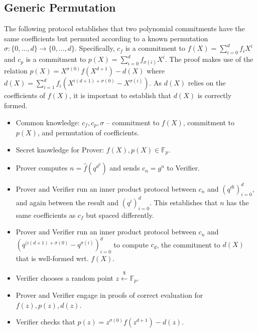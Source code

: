 \documentclass{article}
\theoremstyle{definition}
\begin{document}
\subsection{Generic Permutation}

The following protocol establishes that two polynomial commitments have the same coefficients but permuted according to a known permutation $\sigma : \{0,\ldots,d\} \rightarrow \{0,\ldots,d\}$. Specifically, $c_f$ is a commitment to $f(X) = \sum_{i=0}^d f_i X^i$ and $c_p$ is a commitment to $p(X) = \sum_{i=0}^d f_{\sigma(i)} X^i$. The proof makes use of the relation $p(X) = X^{\sigma(0)} f(X^{d+1}) - d(X)$ where $d(X) = \sum_{i=1}^d f_i (X^{i(d+1) + \sigma(0)} - X^{\sigma(i)})$. As $d(X)$ relies on the coefficients of $f(X)$, it is important to establish that $d(X)$ is correctly formed.

\begin{itemize}
    \item Common knowledge: $c_f, c_p, \sigma$ -- commitment to $f(X)$, commitment to $p(X)$, and permutation of coefficients.
    \item Secret knowledge for Prover: $f(X), p(X) \in \mathbb{F}_p$.
    \item Prover computes $n = \hat{f}(q^{d^2})$ and sends $c_n = g^n$ to Verifier.
    \item Prover and Verifier run an inner product protocol between $c_n$ and $(q^{di})_{i=0}^d$, and again between the result and $(q^i)_{i=0}^d$. This establishes that $n$ has the same coefficients as $c_f$ but spaced differently.
    \item Prover and Verifier run an inner product protocol between $c_n$ and $(q^{(i(d+1) + \sigma(0)} - q^{\sigma(i)})_{i=0}^d$ to compute $c_d$, the commitment to $d(X)$ that is well-formed wrt. $f(X)$.
    \item Verifier chooses a random point $z \xleftarrow{\$} \mathbb{F}_p$.
    \item Prover and Verifier engage in proofs of correct evaluation for $f(z), p(z), d(z)$.
    \item Verifier checks that $p(z) = z^{\sigma(0)} f(z^{d+1}) - d(z)$.
\end{itemize}
\end{document}
